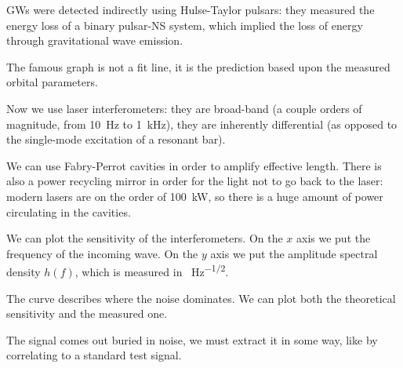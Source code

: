 \documentclass[main.tex]{subfiles}
\begin{document}
GWs were detected indirectly using Hulse-Taylor pulsars: they measured the energy loss of a binary pulsar-NS system, which implied the loss of energy through gravitational wave emission.

The famous graph is not a fit line, it is the prediction based upon the measured orbital parameters.

Now we use laser interferometers: they are broad-band (a couple orders of magnitude, from \SI{10}{Hz} to \SI{1}{kHz}), they are inherently differential (as opposed to the single-mode excitation of a resonant bar). 

We can use Fabry-Perrot cavities in order to amplify effective length. 
There is also a power recycling mirror in order for the light not to go back to the laser: modern lasers are on the order of \SI{100}{kW}, so there is a huge amount of power circulating in the cavities.

We can plot the sensitivity of the interferometers. 
On the \(x\) axis we put the frequency of the incoming wave. 
On the \(y\) axis we put the amplitude spectral density \(h(f)\), which is measured in \SI{}{Hz^{-1/2}}. 


The curve describes where the noise dominates. 
We can plot both the theoretical sensitivity and the measured one.

The signal comes out buried in noise, we must extract it in some way, like by correlating to a standard test signal.
\end{document}
